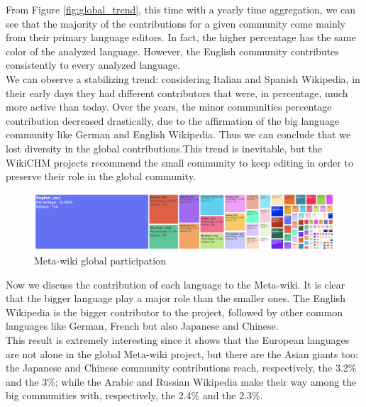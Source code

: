 From Figure \ref{fig:global_trend}, this time with a yearly time aggregation, we can see that the majority of the contributions for a given community come mainly from their primary language editors. In fact, the higher percentage has the same color of the analyzed language. However, the English community contributes consistently to every analyzed language. \\
We can observe a stabilizing trend: considering Italian and Spanish Wikipedia, in their early days they had different contributors that were, in percentage, much more active than today. Over the years, the minor communities percentage contribution decreased drastically, due to the affirmation of the big language community like German and English Wikipedia. Thus we can conclude that we lost diversity in the global contributions.This trend is inevitable, but the WikiCHM projects recommend the small community to keep editing in order to preserve their role in the global community.

\begin{figure}[h]
    \centering
    \includegraphics[width=470px]{img/meta_trend.png}
    \caption{Meta-wiki global participation }
    \label{fig:meta}
\end{figure}

Now we discuss the contribution of each language to the Meta-wiki. It is clear that the bigger language play a major role than the smaller ones. The English Wikipedia is the bigger contributor to the project, followed by other common languages like German, French but also Japanese and Chinese. \\
This result is extremely interesting since it shows that the European languages are not alone in the global Meta-wiki project, but there are the Asian giants too: the Japanese and Chinese community contributions reach, respectively, the 3.2\% and the 3\%; while the Arabic and Russian Wikipedia make their way among the big communities with, respectively, the 2.4\% and the 2.3\%.

